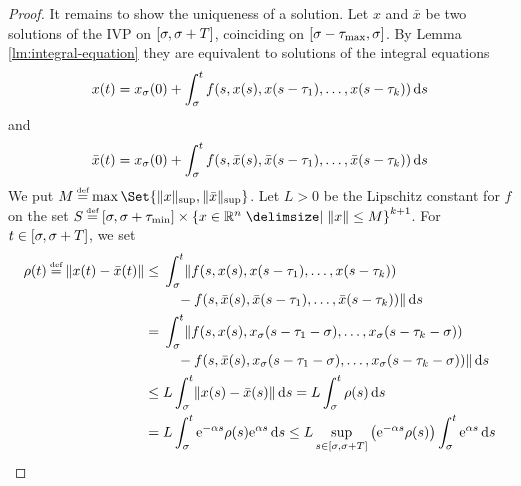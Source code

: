 \begin{proof}
        It remains to show the uniqueness of a solution.
        Let $x$ and $\bar{x}$ be two solutions of the IVP on $\compactum{\tzero}{\tzero+T}$, coinciding on $\compactum{\tzero-\taumax}{\tzero}$.
        By Lemma \ref{lm:integral-equation} they are equivalent to solutions of the integral equations
        \begin{equation*}
            x(t) = x_\tzero(0) + \integral{\tzero}{t} f(s,x(s),x(s-\tau_1),\ldots,x(s-\tau_k))\dx[s]
        \end{equation*}
        and
        \begin{equation*}
            \bar{x}(t) = x_\tzero(0) + \integral{\tzero}{t} f(s,\bar{x}(s),\bar{x}(s-\tau_1),\ldots,\bar{x}(s-\tau_k))\dx[s]
        \end{equation*}
        We put $M\defeq\max\Set{\supnorm{x},\supnorm{\bar{x}}}$. Let $L>0$ be the Lipschitz constant for $f$ on the set $S\defeq\compactum{\tzero}{\tzero+\taumin} \times \set{x\in\R^n\with \nnorm{x}\leq M}^{k+1}$.
        For $t\in\compactum{\tzero}{\tzero+T}$, we set
        \begin{align*}
            \rho(t) \defeq \nnorm*{x(t)-\bar{x}(t)}
            &\leq \!\begin{multlined}[t][0.7\displaywidth]
                \integral{\tzero}{t} \lVert f(s,x(s),x(s-\tau_1),\ldots,x(s-\tau_k))\\
                -f(s,\bar{x}(s),\bar{x}(s-\tau_1),\ldots,\bar{x}(s-\tau_k))\rVert\dx[s]
            \end{multlined}\\
            &= \!\begin{multlined}[t][0.7\displaywidth]
                \integral{\tzero}{t} \lVert f(s,x(s),x_{\tzero}(s-\tau_1-\tzero),\ldots,x_{\tzero}(s-\tau_k-\tzero))\\
                -f(s,\bar{x}(s),x_{\tzero}(s-\tau_1-\tzero),\ldots,x_{\tzero}(s-\tau_k-\tzero))\rVert\dx[s]
            \end{multlined}\\
            & \leq L \integral{\tzero}{t} \nnorm*{x(s)-\bar{x}(s)}\dx[s] = L \integral{\tzero}{t} \rho(s)\dx[s]\\
            &= L \integral{\tzero}{t} \e{-\alpha s}\rho(s)\e{\alpha s}\dx[s] \leq L \sup_{s\in [\tzero,\tzero+T]}\left(\e{-\alpha s}\rho(s)\right)\integral{\tzero}{t} \e{\alpha s}\dx[s]\\

\end{align*}
\end{proof}
